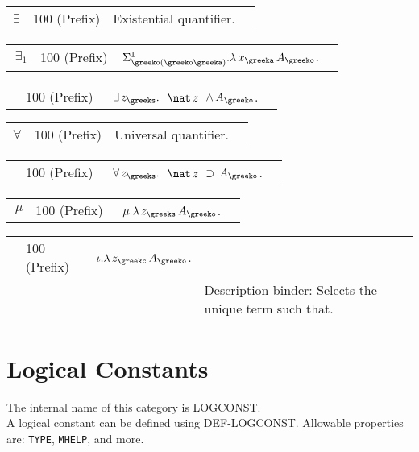 \begin{description} 
\item[EXISTS]  \begin{tabular}{l l l l}
\texttt{$\exists$}&100 (Prefix)&
Existential quantifier.
\end{tabular}

\item[EXISTS1]  \begin{tabular}{l l l l}
\texttt{$\,\exists_{1}$}&100 (Prefix)&\texttt{$ \,\Sigma^{1}_{\greeko(\greeko\greeka)} . \lambda \,x_{\greeka} \,A_{\greeko}$}. \\ 
\end{tabular}

\item[EXISTSN]  \begin{tabular}{l l l l}
&100 (Prefix)&\texttt{$ $ $\exists \,z_{\greeks} . $ $\nat \,z $ $\land \,A_{\greeko}$}. \\ 
\end{tabular}

\item[FORALL]  \begin{tabular}{l l l l}
\texttt{$\forall$}&100 (Prefix)&
Universal quantifier.
\end{tabular}

\item[FORALLN]  \begin{tabular}{l l l l}
&100 (Prefix)&\texttt{$ $ $\forall \,z_{\greeks} . $ $\nat \,z $ $\supset \,A_{\greeko}$}. \\ 
\end{tabular}

\item[MU-BIND]  \begin{tabular}{l l l l}
\texttt{$\,\mu$}&100 (Prefix)&\texttt{$ $ $\mu . \lambda \,z_{\greeks} \,A_{\greeko}$}. \\ 
\end{tabular}

\item[THAT]  \begin{tabular}{l l l l}
&100 (Prefix)&\texttt{$ \iota . \lambda \,z_{\greekc} \,A_{\greeko}$}. \\ 
 & & & 
Description binder: Selects the unique term such that.
\end{tabular}
\item
\end{description}
\chapter{Logical Constants}
The internal name of this category is 
LOGCONST.\\
A logical constant can be defined using DEF-LOGCONST.
Allowable properties are: \texttt{TYPE}, \texttt{MHELP}, and more.

